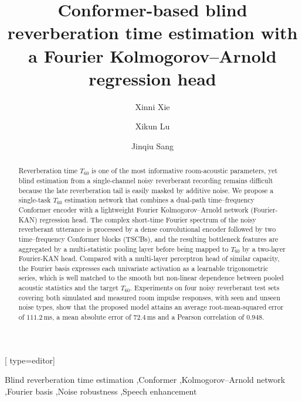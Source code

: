 \documentclass[a4paper,fleqn]{cas-sc}
\begin{document}
\let\WriteBookmarks\relax


\title[mode=title]{Conformer-based blind reverberation time estimation with a Fourier Kolmogorov--Arnold regression head}

\author[1]{Xinni Xie}[%
  type=editor]

\author[1]{Xikun Lu}

\author[1]{Jinqiu Sang}
\cormark[1]



\begin{abstract}
Reverberation time $T_{60}$ is one of the most informative room-acoustic
parameters, yet blind estimation from a single-channel noisy reverberant
recording remains difficult because the late reverberation tail is easily
masked by additive noise. We propose a single-task $T_{60}$ estimation
network that combines a dual-path time--frequency Conformer encoder with
a lightweight Fourier Kolmogorov--Arnold network (Fourier-KAN) regression
head. The complex short-time Fourier
spectrum of the noisy reverberant utterance is processed by a dense
convolutional encoder followed by two time--frequency Conformer blocks
(TSCBs), and the resulting bottleneck features are aggregated by a
multi-statistic pooling layer before being mapped to $T_{60}$ by a
two-layer Fourier-KAN head. Compared with a multi-layer perceptron head of
similar capacity, the Fourier basis expresses each univariate activation as
a learnable trigonometric series, which is well matched to the smooth but
non-linear dependence between pooled acoustic statistics and the target
$T_{60}$. Experiments on four noisy reverberant test sets covering both
simulated and measured room impulse responses, with seen and unseen noise
types, show that the proposed model attains an average root-mean-squared
error of $111.2$\,ms, a mean absolute error of $72.4$\,ms and a Pearson
correlation of $0.948$.
\end{abstract}

\begin{keywords}
Blind reverberation time estimation \sep Conformer \sep Kolmogorov--Arnold
network \sep Fourier basis \sep Noise robustness \sep Speech enhancement
\end{keywords}
\end{document}
